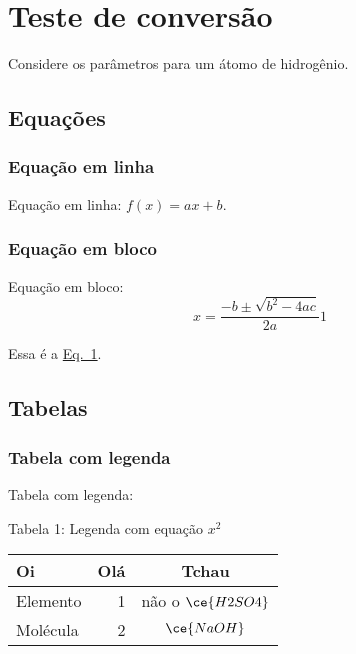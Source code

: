 \hypertarget{teste-de-conversuxe3o}{%
\section{Teste de conversão}\label{teste-de-conversuxe3o}}

Considere os parâmetros para um átomo de hidrogênio.

\hypertarget{equauxe7uxf5es}{%
\subsection{Equações}\label{equauxe7uxf5es}}

\hypertarget{equauxe7uxe3o-em-linha}{%
\subsubsection{Equação em linha}\label{equauxe7uxe3o-em-linha}}

Equação em linha: \(f(x) = ax + b\).

\hypertarget{equauxe7uxe3o-em-bloco}{%
\subsubsection{Equação em bloco}\label{equauxe7uxe3o-em-bloco}}

Equação em bloco: \protect\hypertarget{eq:eq1}{}{\[
    x = \dfrac{ -b \pm \sqrt{b^2 - 4 ac} }{ 2a }
{1}\]}

Essa é a \protect\hyperlink{eq:eq1}{Eq.~1}.

\hypertarget{tabelas}{%
\subsection{Tabelas}\label{tabelas}}

\hypertarget{tabela-com-legenda}{%
\subsubsection{Tabela com legenda}\label{tabela-com-legenda}}

Tabela com legenda:

\hypertarget{tbl:tbl1}{}
\begin{displaytable}{{Tabela 1:} Legenda com equação \(x^2\)}

\begin{tabular}{lrc}

\textbf{Oi} & \textbf{Olá} & \textbf{Tchau}

\\ \midrule

{Elemento} & {1} & {não o \(\ce{H2SO4}\)}\\
{Molécula} & {2} & {\(\ce{NaOH}\)}

\end{tabular}

\end{displaytable}